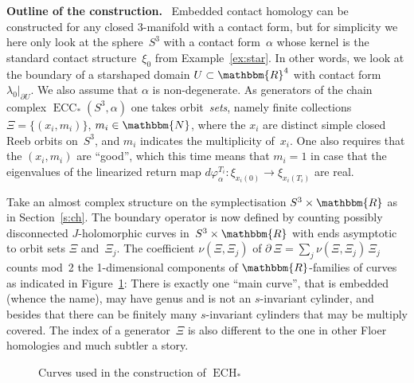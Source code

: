 \documentclass[12pt,twoside]{amsart}
\def\ECH{\operatorname{ECH}}
\theoremstyle{plain}
\numberwithin{figure}{section}
\numberwithin{equation}{section}
\def\1{\:\!}
\def\m{\medskip}
\def\ECC{\operatorname{ECC}}
\def\ECH{\operatorname{ECH}}
\def\gf{\varphi}
\def\NN{\mathbbm{N}}
\def\RR{\mathbbm{R}}
\def\pp{\partial}
\def\ni{\noindent}
\def\m{\medskip}
\begin{document}
\m \ni
{\bf Outline of the construction.}\
%
Embedded contact homology can be constructed for any closed 3-manifold with a contact form,
but for simplicity we here only look at the sphere~$S^3$ with a contact form~$\alpha$
whose kernel is the standard contact structure~$\xi_0$ from Example~\ref{ex:star}.
In other words, we look at the boundary of a starshaped domain $U \subset \RR^4$ with contact form~$\lambda_0 |_{\partial U}$.
We also assume that $\alpha$ is non-degenerate. 
%
As generators of the chain complex $\ECC_*(S^3,\alpha)$ one takes 
orbit~{\it sets}, namely finite collections $\Xi = \{(x_i, m_i)\}$, $m_i \in \NN$, 
where the $x_i$ are distinct simple closed Reeb orbits on~$S^3$, and $m_i$ indicates the multiplicity of~$x_i$.
One also requires that the $(x_i,m_i)$ are ``good'', 
which this time means that $m_i=1$ in case that the eigenvalues of the linearized return map 
$d\gf_{\alpha}^{T_i} \colon \xi_{x_i(0)} \to \xi_{x_i(T_i)}$ are real.

Take an almost complex structure on the symplectisation $S^3 \times \RR$ as in Section~\ref{s:ch}.
The boundary operator is now defined by counting possibly disconnected $J$-holomorphic curves in~$S^3 \times \RR$ 
with ends asymptotic to orbit sets $\Xi$ and~$\Xi_j$. 
The coefficient $\nu (\Xi, \Xi_j)$ of $\pp \1 \Xi = \sum_j \nu (\Xi,\Xi_j)\, \Xi_j$ counts mod~2
the 1-dimensional components of $\RR$-families of curves 
as indicated in Figure~\ref{fig:curvesgG}:
There is exactly one ``main curve'', that is embedded (whence the name),
may have genus and is not an $s$-invariant cylinder, 
and besides that there can be finitely many $s$-invariant cylinders that may be multiply covered.
% 
The index of a generator~$\Xi$ is also different to the one in other Floer homologies
and much subtler a story.

%
%
%
\begin{figure}[ht] 
 \begin{center}
   \leavevmode{}
 \end{center}
 \caption{Curves used in the construction of $\ECH_*$} 
 \label{fig:curvesgG}
\end{figure}
%
%
\end{document}
